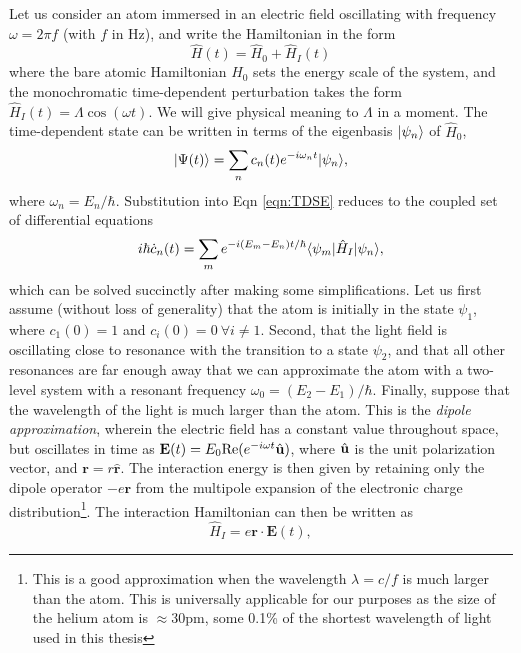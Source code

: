 	Let us consider an atom immersed in an electric field oscillating with frequency $\omega = 2 \pi f$ (with $f$ in Hz), and write the Hamiltonian in the form
	\begin{equation}
		\hat{H}(t) = \hat{H}_0 + \hat{H}_{I}(t)
	\end{equation}
	where the bare atomic Hamiltonian $H_0$ sets the energy scale of the system, and the monochromatic time-dependent perturbation takes the form $\hat{H}_I(t) = \Lambda \cos(\omega t)$.
	We will give physical meaning to $\Lambda$ in a moment.
	The time-dependent state can be written in terms of the eigenbasis $|\psi_n\rangle$ of $\hat{H}_0$,
	\begin{equation}
		|\Psi(t)\rangle = \sum_n c_n(t)e^{-i\omega_n t}|\psi_n\rangle,
	\end{equation}
	where $\omega_n= E_n/\hbar$.
	Substitution into Eqn \ref{eqn:TDSE} reduces to the coupled set of differential equations 
	\begin{equation}
		i\hbar\dot{c}_n(t) = \sum_m e^{-i(E_m-E_n)t/\hbar}\langle\psi_m|\hat{H}_I|\psi_n\rangle,
	\end{equation} 
	which can be solved succinctly after making some simplifications.
	Let us first assume (without loss of generality) that the atom is initially in the state $\psi_1$, where $c_1(0)=1$ and $c_i(0)=0~\forall i\neq1$.
	Second, that the light field is oscillating close to resonance with the transition to a state $\psi_2$, and that all other resonances are far enough away that we can approximate the atom with a two-level system with a resonant frequency $\omega_0 =(E_2-E_1)/\hbar$.
	Finally, suppose that the wavelength of the light is much larger than the atom. 
	This is the \emph{dipole approximation}, wherein the electric field has a constant value throughout space, but oscillates in time as $\textbf{E}(t) = {E}_0 \textrm{Re}(e^{-i\omega t}\hat{\mathbf{u}})$, where $\hat{\mathbf{u}}$ is the unit polarization vector, and $\textbf{r} = r\hat{\textbf{r}}$.
	The interaction energy is then given by retaining only the dipole operator $-e\textbf{r}$ from the multipole expansion of the electronic charge distribution\footnote{This is a good approximation when the wavelength $\lambda = c/f$ is much larger than the atom. This is universally applicable for our purposes as the size of the helium atom is $\approx 30$pm, some 0.1\% of the shortest wavelength of light used in this thesis}.
	The interaction Hamiltonian can then be written as
	\begin{equation}
		\hat{H}_I = e\textbf{r}\cdot\textbf{E}(t),
	\end{equation}
